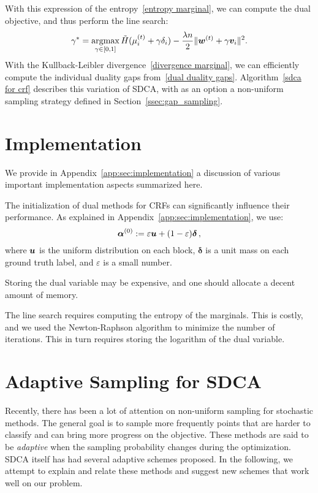 With this expression of the entropy~\eqref{entropy marginal}, we can compute the dual objective, and thus perform the line search:
\begin{equation}\label{crf line search}
	\gamma^* = \operatorname*{argmax}_{\gamma \in [0,1]} \tilde H(\mu_i^{(t)} + \gamma \delta_i) - \frac{\lambda n}{2} \| \boldsymbol{w}^{(t)} + \gamma \bm v_i \|^2.
\end{equation}
With the Kullback-Leibler divergence~\eqref{divergence marginal}, we can efficiently compute the individual duality gaps from~\eqref{dual duality gaps}.
Algorithm~\ref{sdca for crf} describes this variation of SDCA, with as an option a non-uniform sampling strategy defined in  Section~\ref{ssec:gap_sampling}.

\section{Implementation} \label{sec:implementation}
We provide in Appendix~\ref{app:sec:implementation} a discussion of various important implementation aspects summarized here.
\begin{compactenum}
	\item The initialization of dual methods for CRFs can significantly influence their performance. As explained in Appendix~\ref{app:sec:implementation}, we use: 
	\begin{equation} \label{eq:initialization}
		\boldsymbol{\alpha}^{(0)} := \varepsilon \bm u + (1-\varepsilon) \bm\delta \, ,
	\end{equation}
	where $\bm u$ is the uniform distribution on each block, $\bm\delta$ is a unit mass on each ground truth label, and $\varepsilon$ is a small number.
	\item Storing the dual variable may be expensive, and one should allocate a decent amount of memory.
	\item The line search requires computing the entropy of the marginals.
	This is costly, and we used the Newton-Raphson algorithm to minimize the number of iterations.
	This in turn requires storing the logarithm of the dual variable.
\end{compactenum}
\section{Adaptive Sampling for SDCA} \label{Adaptive Sampling}

Recently, there has been a lot of attention on non-uniform sampling for stochastic methods.
The general goal is to sample more frequently points that are harder to classify and can bring more progress on the objective.
These methods are said to be \textit{adaptive} when the sampling probability changes during the optimization.
SDCA itself has had several adaptive schemes proposed.
In the following, we attempt to explain and relate these methods and suggest new schemes that work well on our problem.

